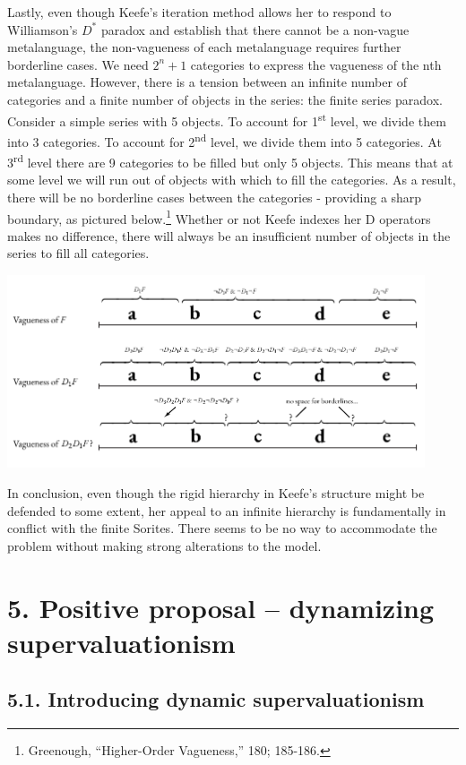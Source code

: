 Lastly, even though Keefe's iteration method allows her to respond to
Williamson's $D^*$ paradox and establish that there cannot be a non-vague
metalanguage, the non-vagueness of each metalanguage requires further
borderline cases. We need \(2^{n} + 1\) categories to express the
vagueness of the nth metalanguage. However, there is a tension between
an infinite number of categories and a finite number of objects in the
series: the finite series paradox. Consider a simple series with 5
objects. To account for 1\textsuperscript{st} level, we divide them into
3 categories. To account for 2\textsuperscript{nd} level, we divide them
into 5 categories. At 3\textsuperscript{rd} level there are 9 categories
to be filled but only 5 objects. This means that at some level we will
run out of objects with which to fill the categories. As a result, there
will be no borderline cases between the categories - providing a sharp
boundary, as pictured below.\footnote{Greenough, ``Higher-Order
  Vagueness,'' 180; 185-186.} Whether or not Keefe indexes her D
operators makes no difference, there will always be an insufficient
number of objects in the series to fill all categories.
\begin{center}
\includegraphics[width=0.925\textwidth]{papers/figures/2-2.pdf}
\end{center}
In conclusion, even though the rigid hierarchy in Keefe's structure
might be defended to some extent, her appeal to an infinite hierarchy is
fundamentally in conflict with the finite Sorites. There seems to be no
way to accommodate the problem without making strong alterations to the
model.

\section{5. Positive proposal -- dynamizing supervaluationism}

\subsection{5.1. Introducing dynamic supervaluationism}

